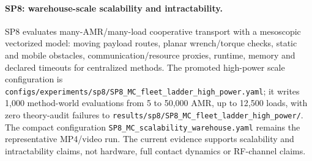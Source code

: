 \paragraph{SP8: warehouse-scale scalability and intractability.}
SP8 evaluates many-AMR/many-load cooperative transport with a mesoscopic vectorized model: moving payload routes, planar wrench/torque checks, static and mobile obstacles, communication/resource proxies, runtime, memory and declared timeouts for centralized methods. The promoted high-power scale configuration is \texttt{configs/experiments/sp8/SP8\_MC\_fleet\_ladder\_high\_power.yaml}; it writes 1,000 method-world evaluations from 5 to 50,000 AMR, up to 12,500 loads, with zero theory-audit failures to \texttt{results/sp8/SP8\_MC\_fleet\_ladder\_high\_power/}. The compact configuration \texttt{SP8\_MC\_scalability\_warehouse.yaml} remains the representative MP4/video run. The current evidence supports scalability and intractability claims, not hardware, full contact dynamics or RF-channel claims.
